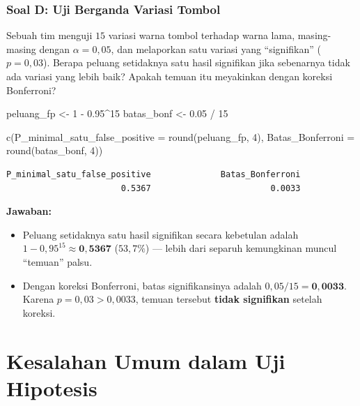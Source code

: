 \documentclass[
  indonesian,
  letterpaper,
]{book}
\newenvironment{Shaded}{\begin{snugshade}}{\end{snugshade}}
\newcommand{\AttributeTok}[1]{\textcolor[rgb]{0.40,0.45,0.13}{#1}}
\newcommand{\DecValTok}[1]{\textcolor[rgb]{0.68,0.00,0.00}{#1}}
\newcommand{\FloatTok}[1]{\textcolor[rgb]{0.68,0.00,0.00}{#1}}
\newcommand{\FunctionTok}[1]{\textcolor[rgb]{0.28,0.35,0.67}{#1}}
\newcommand{\NormalTok}[1]{\textcolor[rgb]{0.00,0.23,0.31}{#1}}
\newcommand{\OtherTok}[1]{\textcolor[rgb]{0.00,0.23,0.31}{#1}}
\newcommand{\SpecialCharTok}[1]{\textcolor[rgb]{0.37,0.37,0.37}{#1}}
\providecommand{\tightlist}{%
  \setlength{\itemsep}{0pt}\setlength{\parskip}{0pt}}
\begin{document}
\subsubsection{Soal D: Uji Berganda Variasi
Tombol}\label{soal-d-uji-berganda-variasi-tombol}

Sebuah tim menguji \(15\) variasi warna tombol terhadap warna lama,
masing-masing dengan \(\alpha = 0{,}05\), dan melaporkan satu variasi
yang ``signifikan'' (\(p = 0{,}03\)). Berapa peluang setidaknya satu
hasil signifikan jika sebenarnya tidak ada variasi yang lebih baik?
Apakah temuan itu meyakinkan dengan koreksi Bonferroni?

\begin{Shaded}
\begin{Highlighting}[]
\NormalTok{peluang\_fp }\OtherTok{\textless{}{-}} \DecValTok{1} \SpecialCharTok{{-}} \FloatTok{0.95}\SpecialCharTok{\^{}}\DecValTok{15}
\NormalTok{batas\_bonf }\OtherTok{\textless{}{-}} \FloatTok{0.05} \SpecialCharTok{/} \DecValTok{15}

\FunctionTok{c}\NormalTok{(}\AttributeTok{P\_minimal\_satu\_false\_positive =} \FunctionTok{round}\NormalTok{(peluang\_fp, }\DecValTok{4}\NormalTok{),}
  \AttributeTok{Batas\_Bonferroni =} \FunctionTok{round}\NormalTok{(batas\_bonf, }\DecValTok{4}\NormalTok{))}
\end{Highlighting}
\end{Shaded}

\begin{verbatim}
P_minimal_satu_false_positive              Batas_Bonferroni 
                       0.5367                        0.0033 
\end{verbatim}

\textbf{Jawaban:}

\begin{itemize}
\tightlist
\item
  Peluang setidaknya satu hasil signifikan secara kebetulan adalah
  \(1 - 0{,}95^{15} \approx \mathbf{0{,}5367}\) (\(53{,}7\%\)) --- lebih
  dari separuh kemungkinan muncul ``temuan'' palsu.
\item
  Dengan koreksi Bonferroni, batas signifikansinya adalah
  \(0{,}05 / 15 = \mathbf{0{,}0033}\). Karena \(p = 0{,}03 > 0{,}0033\),
  temuan tersebut \textbf{tidak signifikan} setelah koreksi.
\end{itemize}

\section{Kesalahan Umum dalam Uji
Hipotesis}\label{kesalahan-umum-dalam-uji-hipotesis}
\end{document}
